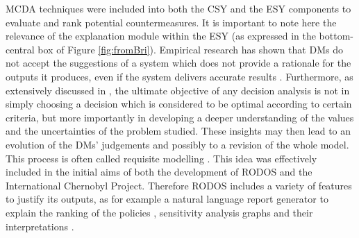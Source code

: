 \begin{figure*}
\begin{center}
\caption{Conceptual structure of RODOS from \citet{Leonelli2013} and after \cite{raskob2009}. The left column lists the subsystems, the central one describes the functionalities of each of these and the right one summarizes potential countermeasure both in the short and in the long term.}
\label{fig:fromBri}
\end{center}
\end{figure*} 

MCDA techniques were included into both the CSY and the ESY components to evaluate and rank potential countermeasures. It is important to note here the relevance of the explanation module within the ESY (as expressed in the bottom-central box of Figure \ref{fig:fromBri}). Empirical research has shown that DMs do not accept the suggestions of a system which does not provide a rationale for the outputs it produces, even if the system delivers accurate results  \citep{Papamichail2013}. Furthermore, as extensively discussed in \citet{French2009}, the ultimate objective of any decision analysis is not in simply choosing a decision which is considered to be optimal according to certain criteria, but more importantly in developing a deeper understanding of the values and the uncertainties of the problem studied. These insights may then lead to an evolution of the DMs' judgements and possibly to a revision of the whole model. This process is often called requisite modelling \citep{Phillips1984}. This idea was effectively included in the initial aims of both the development of RODOS and the International Chernobyl Project. Therefore RODOS includes a variety of features to justify its outputs, as for example a natural language report generator to explain the ranking of the policies \citep{Papamichail2003}, sensitivity analysis graphs and their interpretations \citep{Papamichail2005}.

